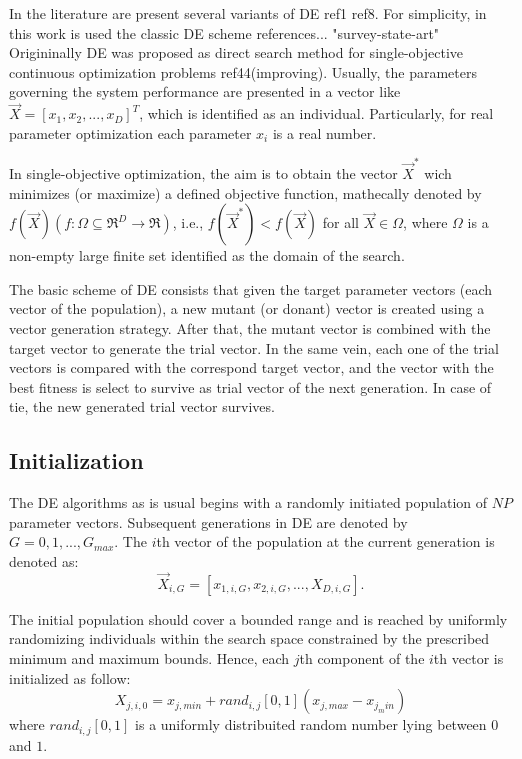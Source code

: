 In the literature are present several variants of DE ref1 ref8.
%
For simplicity, in this work is used the classic DE scheme references... "survey-state-art"
%
Origininally DE was proposed as direct search method for single-objective continuous optimization problems ref44(improving).
%
Usually, the parameters governing the system performance are presented in a vector like $\vec{X} = [x_1, x_2, ..., x_D ]^T$, which is identified as an individual.
%
Particularly, for real parameter optimization each parameter $x_i$ is a real number.
%

In single-objective optimization, the aim is to obtain the vector $\vec{X}^*$ wich minimizes (or maximize) a defined objective function, mathecally denoted by $f(\vec{X})(f : \Omega \subseteq \Re^D \rightarrow \Re)$, i.e., $f(\vec{X}^*) < f(\vec{X})$ for all $\vec{X} \in \Omega$, where $\Omega$ is a non-empty large finite set identified as the domain of the search.
%

The basic scheme of DE consists that given the target parameter vectors (each vector of the population), a new mutant (or donant) vector is created using a vector generation strategy.
%
After that, the mutant vector is combined with the target vector to generate the trial vector.
%
In the same vein, each one of the trial vectors is compared with the correspond target vector, and the vector with the best fitness is select to survive as trial vector of the next generation.
%
In case of tie, the new generated trial vector survives.


\subsection{Initialization}


The DE algorithms as is usual begins with a randomly initiated population of $NP$ parameter vectors.
%
Subsequent generations in DE are denoted by $G= 0,1, ..., G_{max}$.
%
The $i$th vector of the population at the current generation is denoted as:
\begin{equation}
\vec{X}_{i,G} = [x_{1,i,G}, x_{2,i,G},..., X_{D,i, G}].
\end{equation}
%

The initial population should cover a bounded range and is reached by uniformly randomizing individuals within the search space constrained by the prescribed minimum and maximum bounds.
%
Hence, each $j$th component of the $i$th vector is initialized as follow:
\begin{equation}
X_{j,i,0} = x_{j,min} + rand_{i,j}[0,1] (x_{j,max} - x_{j_min})
\end{equation}
where $rand_{i,j}[0,1]$ is a uniformly distribuited random number lying between $0$ and $1$.

